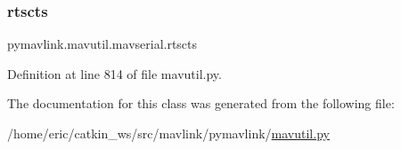 \subsubsection{\texorpdfstring{rtscts}{rtscts}}
{\footnotesize\ttfamily pymavlink.\+mavutil.\+mavserial.\+rtscts}



Definition at line 814 of file mavutil.\+py.



The documentation for this class was generated from the following file\+:\begin{DoxyCompactItemize}
\item 
/home/eric/catkin\+\_\+ws/src/mavlink/pymavlink/\mbox{\hyperlink{mavutil_8py}{mavutil.\+py}}\end{DoxyCompactItemize}
